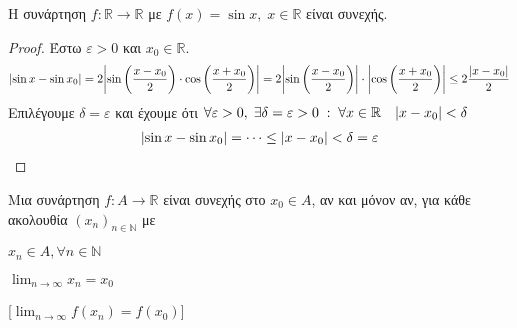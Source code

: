 \begin{prop}
  Η συνάρτηση $ f \colon \mathbb{R} \to \mathbb{R} $ με $ f(x)= \sin{x}, \; x \in 
  \mathbb{R}$ είναι συνεχής.
\end{prop}
\begin{proof}
\item {}
  Έστω $ \varepsilon >0 $ και $ x_{0} \in \mathbb{R} $. 
  \[
    \abs{\sin{x} - \sin{x_{0}}} = 2 \abs{\sin{\left(\frac{x - x_{0}}{2}\right)} 
    \cdot \cos{\left(\frac{x+ x_{0}}{2}\right)}} = 2 
    \abs{\sin{\left(\frac{x- x_{0}}{2}\right)}} \cdot 
    \abs{\cos{\left(\frac{x+ x_{0}}{2}\right)}} \leq 2 \frac{\abs{x- x_{0}}}{2}
  \]
  Επιλέγουμε $ \delta = \varepsilon $ και έχουμε ότι $ \forall \varepsilon >0, \; 
  \exists \delta = \varepsilon > 0 \; : \; \forall x \in \mathbb{R} \quad 
  \abs{x- x_{0}} < \delta $
  \begin{align*}
    \abs{\sin{x} - \sin{x_{0}}} = \cdots \leq \abs{x - x_{0}} < \delta = 
    \varepsilon  
  \end{align*} 
\end{proof}

\begin{thm}
  Μια συνάρτηση $ f \colon A \to \mathbb{R} $ είναι συνεχής στο $ x_{0} \in A $, 
  αν και μόνον αν, για κάθε ακολουθία $ {(x_{n})}_{n \in \mathbb{N}} $ με

  \vspace{\baselineskip}

  \begin{minipage}{0.25\textwidth}
    \begin{myitemize}
      \item $ x_{n} \in A, \forall n \in \mathbb{N} $ \hfill {}
      \item $ \lim_{n \to \infty} x_{n} = x_{0} $ \hfill {}
    \end{myitemize}
  \end{minipage}
  [$ \lim_{n \to \infty} f(x_{n}) = f(x_{0}) $]
\end{thm}

